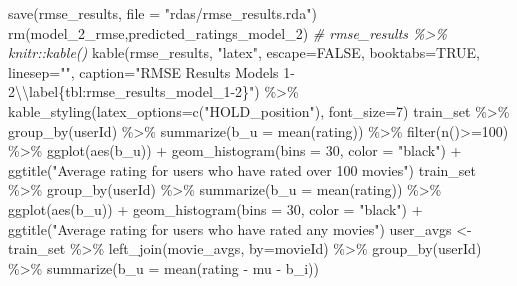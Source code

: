 \documentclass[
]{article}
\newenvironment{Shaded}{}{}
\newcommand{\AttributeTok}[1]{\textcolor[rgb]{0.49,0.56,0.16}{#1}}
\newcommand{\CommentTok}[1]{\textcolor[rgb]{0.38,0.63,0.69}{\textit{#1}}}
\newcommand{\ConstantTok}[1]{\textcolor[rgb]{0.53,0.00,0.00}{#1}}
\newcommand{\DecValTok}[1]{\textcolor[rgb]{0.25,0.63,0.44}{#1}}
\newcommand{\FunctionTok}[1]{\textcolor[rgb]{0.02,0.16,0.49}{#1}}
\newcommand{\NormalTok}[1]{#1}
\newcommand{\OtherTok}[1]{\textcolor[rgb]{0.00,0.44,0.13}{#1}}
\newcommand{\SpecialCharTok}[1]{\textcolor[rgb]{0.25,0.44,0.63}{#1}}
\newcommand{\StringTok}[1]{\textcolor[rgb]{0.25,0.44,0.63}{#1}}
\begin{document}
\begin{Shaded}
\begin{Highlighting}[]
\FunctionTok{save}\NormalTok{(rmse\_results, }\AttributeTok{file =} \StringTok{"rdas/rmse\_results.rda"}\NormalTok{)}
\FunctionTok{rm}\NormalTok{(model\_2\_rmse,predicted\_ratings\_model\_2)}
\CommentTok{\# rmse\_results \%\textgreater{}\% knitr::kable()}
  \FunctionTok{kable}\NormalTok{(rmse\_results, }\StringTok{"latex"}\NormalTok{, }\AttributeTok{escape=}\ConstantTok{FALSE}\NormalTok{, }\AttributeTok{booktabs=}\ConstantTok{TRUE}\NormalTok{, }\AttributeTok{linesep=}\StringTok{""}\NormalTok{, }\AttributeTok{caption=}\StringTok{"RMSE Results Models 1{-}2}\SpecialCharTok{\textbackslash{}\textbackslash{}}\StringTok{label\{tbl:rmse\_results\_model\_1{-}2\}"}\NormalTok{) }\SpecialCharTok{\%\textgreater{}\%}
    \FunctionTok{kable\_styling}\NormalTok{(}\AttributeTok{latex\_options=}\FunctionTok{c}\NormalTok{(}\StringTok{"HOLD\_position"}\NormalTok{), }\AttributeTok{font\_size=}\DecValTok{7}\NormalTok{)}
\NormalTok{train\_set }\SpecialCharTok{\%\textgreater{}\%} 
  \FunctionTok{group\_by}\NormalTok{(userId) }\SpecialCharTok{\%\textgreater{}\%} 
  \FunctionTok{summarize}\NormalTok{(}\AttributeTok{b\_u =} \FunctionTok{mean}\NormalTok{(rating)) }\SpecialCharTok{\%\textgreater{}\%} 
  \FunctionTok{filter}\NormalTok{(}\FunctionTok{n}\NormalTok{()}\SpecialCharTok{\textgreater{}=}\DecValTok{100}\NormalTok{) }\SpecialCharTok{\%\textgreater{}\%}
  \FunctionTok{ggplot}\NormalTok{(}\FunctionTok{aes}\NormalTok{(b\_u)) }\SpecialCharTok{+} 
  \FunctionTok{geom\_histogram}\NormalTok{(}\AttributeTok{bins =} \DecValTok{30}\NormalTok{, }\AttributeTok{color =} \StringTok{"black"}\NormalTok{) }\SpecialCharTok{+} 
  \FunctionTok{ggtitle}\NormalTok{(}\StringTok{"Average rating for users who have rated over 100 movies"}\NormalTok{)}
\NormalTok{train\_set }\SpecialCharTok{\%\textgreater{}\%} 
  \FunctionTok{group\_by}\NormalTok{(userId) }\SpecialCharTok{\%\textgreater{}\%} 
  \FunctionTok{summarize}\NormalTok{(}\AttributeTok{b\_u =} \FunctionTok{mean}\NormalTok{(rating)) }\SpecialCharTok{\%\textgreater{}\%} 
  \FunctionTok{ggplot}\NormalTok{(}\FunctionTok{aes}\NormalTok{(b\_u)) }\SpecialCharTok{+} 
  \FunctionTok{geom\_histogram}\NormalTok{(}\AttributeTok{bins =} \DecValTok{30}\NormalTok{, }\AttributeTok{color =} \StringTok{"black"}\NormalTok{) }\SpecialCharTok{+} 
  \FunctionTok{ggtitle}\NormalTok{(}\StringTok{"Average rating for users who have rated any movies"}\NormalTok{)}
\NormalTok{user\_avgs }\OtherTok{\textless{}{-}}\NormalTok{ train\_set }\SpecialCharTok{\%\textgreater{}\%} 
  \FunctionTok{left\_join}\NormalTok{(movie\_avgs, }\AttributeTok{by=}\StringTok{\textquotesingle{}movieId\textquotesingle{}}\NormalTok{) }\SpecialCharTok{\%\textgreater{}\%}
  \FunctionTok{group\_by}\NormalTok{(userId) }\SpecialCharTok{\%\textgreater{}\%}
  \FunctionTok{summarize}\NormalTok{(}\AttributeTok{b\_u =} \FunctionTok{mean}\NormalTok{(rating }\SpecialCharTok{{-}}\NormalTok{ mu }\SpecialCharTok{{-}}\NormalTok{ b\_i))}


\end{Highlighting}
\end{Shaded}
\end{document}
